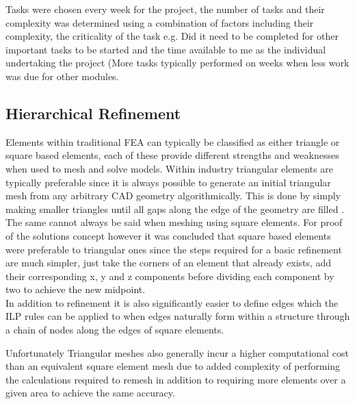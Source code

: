 \noindent
Tasks were chosen every week for the project, the number of tasks and their complexity was determined using a combination of factors including their complexity, the criticality of the task e.g. Did it need to be completed for other important tasks to be started and the time available to me as the individual undertaking the project (More tasks typically performed on weeks when less work was due for other modules. \\ 


\subsection{Hierarchical Refinement}
\noindent
Elements within traditional FEA can typically be classified as either triangle or square based elements, each of these provide different strengths and weaknesses when used                                                                                                                                                                                                                                                                                                                                                                                                                                                                         to mesh and solve models. Within industry triangular elements are typically preferable since it is always possible to generate an initial triangular mesh from any arbitrary CAD geometry algorithmically. This is done by simply making smaller triangles until all gaps along the edge of the geometry are filled \cite{DelaunyTriangles}. The same cannot always be said  when meshing using square elements. For proof of the solutions concept however it was concluded that square based elements were preferable to triangular ones since the steps required for a basic refinement are much simpler, just take the corners of an element that already exists, add their corresponding x, y and z components before dividing each component by two to achieve the new midpoint. \\ 

\noindent
In addition to refinement it is also significantly easier to define edges which the ILP rules can be applied to when edges naturally form within a structure through a chain of nodes along the edges of square elements.


\noindent
Unfortunately Triangular meshes also generally incur a higher computational cost than an equivalent square element mesh due to added complexity of performing the calculations required to remesh in addition to requiring more elements over a given area to achieve the same accuracy. \\

